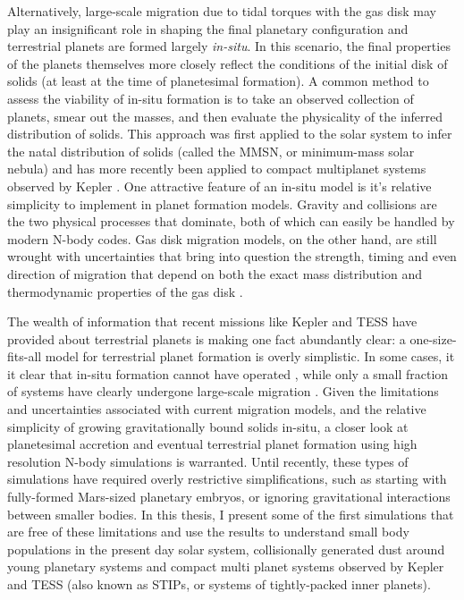 Alternatively, large-scale migration due to tidal torques with the gas disk may play an insignificant role in shaping the final planetary configuration and terrestrial planets are formed largely \textit{in-situ}. In this scenario, the final properties of the planets themselves more closely reflect the conditions of the initial disk of solids (at least at the time of planetesimal formation). A common method to assess the viability of in-situ formation is to take an observed collection of planets, smear out the masses, and then evaluate the physicality of the inferred distribution of solids. This approach was first applied to the solar system to infer the natal distribution of solids (called the MMSN, or minimum-mass solar nebula) \cite{hayashi81} and has more recently been applied to compact multiplanet systems observed by Kepler \cite{chiang13, dai20}. One attractive feature of an in-situ model is it's relative simplicity to implement in planet formation models. Gravity and collisions are the two physical processes that dominate, both of which can easily be handled by modern N-body codes. Gas disk migration models, on the other hand, are still wrought with uncertainties that bring into question the strength, timing and even direction of migration that depend on both the exact mass distribution and thermodynamic properties of the gas disk \cite{ayliffe10, bitsch13, ogihara18}.

The wealth of information that recent missions like Kepler and TESS have provided about terrestrial planets is making one fact abundantly clear: a one-size-fits-all model for terrestrial planet formation is overly simplistic. In some cases, it it clear that in-situ formation cannot have operated \cite{raymond14}, while only a small fraction of systems have clearly undergone large-scale migration \cite{he22}. Given the limitations and uncertainties associated with current migration models, and the relative simplicity of growing gravitationally bound solids in-situ, a closer look at planetesimal accretion and eventual terrestrial planet formation using high resolution N-body simulations is warranted. Until recently, these types of simulations have required overly restrictive simplifications, such as starting with fully-formed Mars-sized planetary embryos, or ignoring gravitational interactions between smaller bodies. In this thesis, I present some of the first simulations that are free of these limitations and use the results to understand small body populations in the present day solar system, collisionally generated dust around young planetary systems and compact multi planet systems observed by Kepler and TESS (also known as STIPs, or systems of tightly-packed inner planets).

